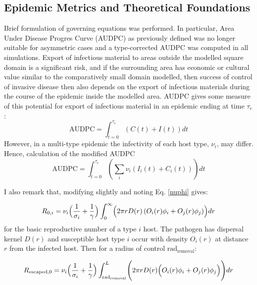 \documentclass[11pt,letterpaper]{article}
\begin{document}
	\subsection*{Epidemic Metrics and Theoretical Foundations} 
	Brief formulation of governing equations was performed. In particular, Area Under Disease Progres Curve (AUDPC) as previously defined \cite{Cunniffe2015} was no longer suitable for asymmetric cases and a type-corrected AUDPC was computed in all simulations.
	Export of infectious material to areas outside the modelled square domain is a significant risk, and if the surrounding area has economic or cultural value similar to the comparatively small domain modelled, then success of control of invasive disease then also depends on the export of infectious materials during the course of the epidemic inside the modelled area. AUDPC gives some measure of this potential for export \cite{Cunniffe2015} of infectious material in an epidemic ending at time $\tau_{e}$: 
	\begin{equation}
	\mathrm{AUDPC} = \int_{t = 0}^{\tau_{e}}\left( C(t) + I(t)\right)  dt  
	\end{equation}
	However, in a multi-type epidemic the infectivity of each host type, $\nu_{i}$, may differ. Hence, calculation of the modified AUDPC 
	\begin{equation}
		\mathrm{AUDPC} = \int_{t = 0}^{\tau_{e}} \left( \sum_{i} \nu_{i} (I_{i}(t) + C_{i}(t)) \right) dt
	\end{equation}

	 I also remark that, modifying \cite{vandenBosch2024} slightly and noting Eq. \ref{nuphi} gives:
	
	\begin{equation}
		R_{0, i} = \nu_{i} \Bigl(\frac{1}{\sigma_{i}} +  \frac{1} {\gamma} \Bigr)   \int_{0}^{\infty} \Bigl(  2 \pi r D(r) \left( O_i(r)\phi_{i} + O_{j}(r)\phi_{j} \right) \Bigr) dr
	\end{equation}
	for the basic reproductive number of a type $i$ host. The pathogen has dispersal kernel $D(r)$ and susceptible host type $i$ occur with density $O_{i}(r)$ at distance $r$ from the infected host.  Then for a radius of control $\mathrm{rad}_{\mathrm{removal}}$:
	
	\begin{equation}
		\label{gnocont}
		R_{\mathrm{escaped}, 0} = \nu_{i} \Bigl(\frac{1}{\sigma_{i}} +  \frac{1} {\gamma} \Bigr) \int_{\mathrm{rad}_\mathrm{removal}}^{L}  \Biggl( 2 \pi r D(r)\Bigl( O_i(r)\phi_{i} + O_{j}(r)\phi_{j} \Bigr)\Biggr) dr
	\end{equation}
	
\end{document}
